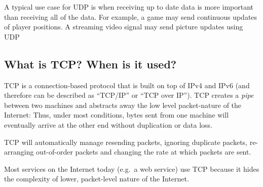 A typical use case for UDP is when receiving up to date data is more
important than receiving all of the data. For example, a game may send
continuous updates of player positions. A streaming video signal may
send picture updates using UDP

\subsection{What is TCP? When is it
used?}\label{what-is-tcp-when-is-it-used}

TCP is a connection-based protocol that is built on top of IPv4 and IPv6
(and therefore can be described as ``TCP/IP'' or ``TCP over IP''). TCP
creates a \emph{pipe} between two machines and abstracts away the low
level packet-nature of the Internet: Thus, under most conditions, bytes
sent from one machine will eventually arrive at the other end without
duplication or data loss.

TCP will automatically manage resending packets, ignoring duplicate
packets, re-arranging out-of-order packets and changing the rate at
which packets are sent.

Most services on the Internet today (e.g.~a web service) use TCP because
it hides the complexity of lower, packet-level nature of the Internet.
